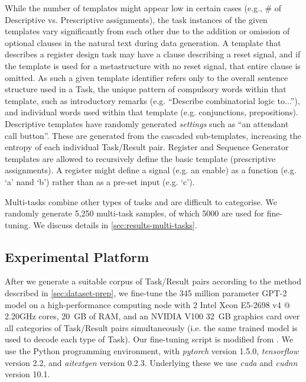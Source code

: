 While the number of templates might appear low in certain cases (e.g., \# of Descriptive vs. Prescriptive assignments), the task instances of the given templates vary significantly from each other due to the addition or omission of optional clauses in the natural text during data generation.  A template that describes a register design task may have a clause describing a reset signal, and if the template is used for a metastructure with no reset signal, that entire clause is omitted.
As such a given template identifier refers only to the overall sentence structure used in a Task, the unique pattern of compulsory words within that template, such as introductory remarks (e.g. ``Describe combinatorial logic to...''), and individual words used within that template (e.g. conjunctions, prepositions).
Descriptive templates have randomly generated \emph{settings} such as ``an attendant call button''. These are generated from the cascaded sub-templates, increasing the entropy of each individual Task/Result pair.
Register and Sequence Generator templates are allowed to recursively define the basic template (prescriptive assignments).
A register might define a signal (e.g. an enable) as a function (e.g. `a' nand `b') rather than as a pre-set input (e.g. `c').

Multi-tasks combine other types of tasks and are difficult to categorise. We randomly generate 5,250 multi-task samples, of which 5000 are used for fine-tuning. We discuss details in \autoref{sec:results-multi-tasks}.

\subsection{Experimental Platform}
After we generate a suitable corpus of Task/Result pairs according to the method described in \autoref{sec:dataset-prep}, we fine-tune the 345 million parameter GPT-2 model on a high-performance computing node with 2 Intel Xeon E5-2698 v4 @ 2.20GHz cores, 20~GB of RAM, and an NVIDIA V100 32~GB graphics card over all categories of Task/Result pairs simultaneously (i.e. the same trained model is used to decode each type of Task). Our fine-tuning script is modified from \cite{aitextgen}. 
We use the Python programming environment, with \emph{pytorch} version 1.5.0, \emph{tensorflow} version 2.2, and \emph{aitextgen} version 0.2.3. Underlying these we use \emph{cuda} and \emph{cudnn} version 10.1.

